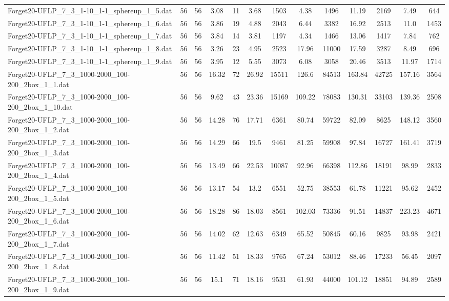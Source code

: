 \begin{table}[!ht]
{\begin{tabular}{lcccccccccccc}
Forget20-UFLP\_7\_3\_1-10\_1-1\_sphereup\_1\_5.dat & 56 & 56 & 3.08 & 11 & 3.68 & 1503 & 4.38 & 1496 & 11.19 & 2169 & 7.49 & 644 \\
Forget20-UFLP\_7\_3\_1-10\_1-1\_sphereup\_1\_6.dat & 56 & 56 & 3.86 & 19 & 4.88 & 2043 & 6.44 & 3382 & 16.92 & 2513 & 11.0 & 1453 \\
Forget20-UFLP\_7\_3\_1-10\_1-1\_sphereup\_1\_7.dat & 56 & 56 & 3.84 & 14 & 3.81 & 1197 & 4.34 & 1466 & 13.06 & 1417 & 7.84 & 762 \\
Forget20-UFLP\_7\_3\_1-10\_1-1\_sphereup\_1\_8.dat & 56 & 56 & 3.26 & 23 & 4.95 & 2523 & 17.96 & 11000 & 17.59 & 3287 & 8.49 & 696 \\
Forget20-UFLP\_7\_3\_1-10\_1-1\_sphereup\_1\_9.dat & 56 & 56 & 3.95 & 12 & 5.55 & 3073 & 6.08 & 3058 & 20.46 & 3513 & 11.97 & 1714 \\
Forget20-UFLP\_7\_3\_1000-2000\_100-200\_2box\_1\_1.dat & 56 & 56 & 16.32 & 72 & 26.92 & 15511 & 126.6 & 84513 & 163.84 & 42725 & 157.16 & 3564 \\
Forget20-UFLP\_7\_3\_1000-2000\_100-200\_2box\_1\_10.dat & 56 & 56 & 9.62 & 43 & 23.36 & 15169 & 109.22 & 78083 & 130.31 & 33103 & 139.36 & 2508 \\
Forget20-UFLP\_7\_3\_1000-2000\_100-200\_2box\_1\_2.dat & 56 & 56 & 14.28 & 76 & 17.71 & 6361 & 80.74 & 59722 & 82.09 & 8625 & 148.12 & 3560 \\
Forget20-UFLP\_7\_3\_1000-2000\_100-200\_2box\_1\_3.dat & 56 & 56 & 14.29 & 66 & 19.5 & 9461 & 81.25 & 59908 & 97.84 & 16727 & 161.41 & 3719 \\
Forget20-UFLP\_7\_3\_1000-2000\_100-200\_2box\_1\_4.dat & 56 & 56 & 13.49 & 66 & 22.53 & 10087 & 92.96 & 66398 & 112.86 & 18191 & 98.99 & 2833 \\
Forget20-UFLP\_7\_3\_1000-2000\_100-200\_2box\_1\_5.dat & 56 & 56 & 13.17 & 54 & 13.2 & 6551 & 52.75 & 38553 & 61.78 & 11221 & 95.62 & 2452 \\
Forget20-UFLP\_7\_3\_1000-2000\_100-200\_2box\_1\_6.dat & 56 & 56 & 18.28 & 86 & 18.03 & 8561 & 102.03 & 73336 & 91.51 & 14837 & 223.23 & 4671 \\
Forget20-UFLP\_7\_3\_1000-2000\_100-200\_2box\_1\_7.dat & 56 & 56 & 14.02 & 62 & 12.63 & 6349 & 65.52 & 50845 & 60.16 & 9825 & 93.98 & 2421 \\
Forget20-UFLP\_7\_3\_1000-2000\_100-200\_2box\_1\_8.dat & 56 & 56 & 11.42 & 51 & 18.33 & 9765 & 67.24 & 53012 & 88.46 & 17233 & 56.45 & 2097 \\
Forget20-UFLP\_7\_3\_1000-2000\_100-200\_2box\_1\_9.dat & 56 & 56 & 15.1 & 71 & 18.16 & 9531 & 61.93 & 44000 & 101.12 & 18851 & 94.89 & 2589 \\

\end{tabular}}
\end{table}
